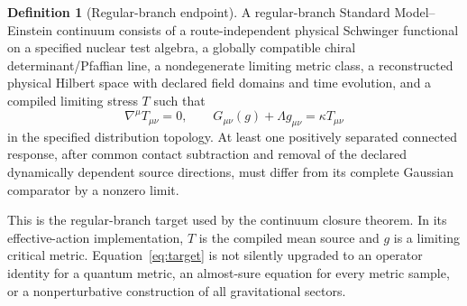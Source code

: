 \documentclass[11pt,a4paper,oneside]{book}
\theoremstyle{plain}
\theoremstyle{definition}
\newtheorem{definition}[theorem]{Definition}
\theoremstyle{remark}
\newcommand{\src}[2]{\cite{#1}}
\begin{document}
\begin{definition}[Regular-branch endpoint]
\label{def:endpoint}
A regular-branch Standard Model--Einstein continuum consists of a route-independent physical Schwinger functional on a specified nuclear test algebra, a globally compatible chiral determinant/Pfaffian line, a nondegenerate limiting metric class, a reconstructed physical Hilbert space with declared field domains and time evolution, and a compiled limiting stress $T$ such that
\begin{equation}
 \nabla^\mu T_{\mu\nu}=0,
 \qquad G_{\mu\nu}(g)+\Lambda g_{\mu\nu}=\kappa T_{\mu\nu}
 \label{eq:target}
\end{equation}
in the specified distribution topology. At least one positively separated connected response, after common contact subtraction and removal of the declared dynamically dependent source directions, must differ from its complete Gaussian comparator by a nonzero limit.
\end{definition}
This is the regular-branch target used by the continuum closure theorem. In its effective-action implementation, $T$ is the compiled mean source and $g$ is a limiting critical metric. Equation~\eqref{eq:target} is not silently upgraded to an operator identity for a quantum metric, an almost-sure equation for every metric sample, or a nonperturbative construction of all gravitational sectors. \src{R18}{def:v18v51-hypotheses,thm:v18v51-conditional-closure}
\end{document}
